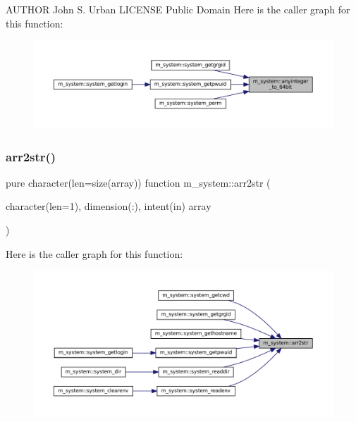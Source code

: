 A\+U\+T\+H\+OR John S. Urban L\+I\+C\+E\+N\+SE Public Domain Here is the caller graph for this function\+:\nopagebreak
\begin{figure}[H]
\begin{center}
\leavevmode
\includegraphics[width=350pt]{namespacem__system_a151da54be39dddcf270cceeff3243438_icgraph}
\end{center}
\end{figure}
\mbox{\label{namespacem__system_aeb3d7d4cb39d59917910a3ae2532206d}} 
\subsubsection{\texorpdfstring{arr2str()}{arr2str()}}
{\footnotesize\ttfamily pure character(len=size(array)) function m\+\_\+system\+::arr2str (\begin{DoxyParamCaption}\item[{character(len=1), dimension(\+:), intent(in)}]{array }\end{DoxyParamCaption})\hspace{0.3cm}{\ttfamily [private]}}

Here is the caller graph for this function\+:\nopagebreak
\begin{figure}[H]
\begin{center}
\leavevmode
\includegraphics[width=350pt]{namespacem__system_aeb3d7d4cb39d59917910a3ae2532206d_icgraph}
\end{center}
\end{figure}
\mbox{\label{namespacem__system_aa7c5445619aa15cd2301fe17f7c3b73c}} 
